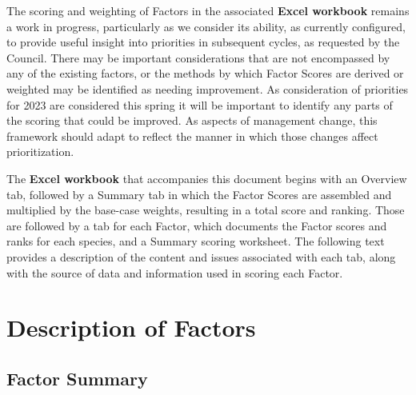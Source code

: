 \documentclass[11pt,
  english,
  a4paper,
]{article}
\begin{document}
\leavevmode\tagmcend\tagstructend\par


The scoring and weighting of Factors in the associated \textbf{Excel workbook} remains a work in progress, particularly as we consider its ability, as currently configured, to provide useful insight into priorities in subsequent cycles, as requested by the Council. There may be important considerations that are not encompassed by any of the existing factors, or the methods by which Factor Scores are derived or weighted may be identified as needing improvement. As consideration of priorities for 2023 are considered this spring it will be important to identify any parts of the scoring that could be improved. As aspects of management change, this framework should adapt to reflect the manner in which those changes affect prioritization.

\leavevmode\tagmcend\tagstructend\par


The \textbf{Excel workbook} that accompanies this document begins with an Overview tab, followed by a Summary tab in which the Factor Scores are assembled and multiplied by the base-case weights, resulting in a total score and ranking. Those are followed by a tab for each Factor, which documents the Factor scores and ranks for each species, and a Summary scoring worksheet. The following text provides a description of the content and issues associated with each tab, along with the source of data and information used in scoring each Factor.

\leavevmode\tagmcend\tagstructend\par


\hypertarget{description-of-factors}{%
\section{Description of Factors}\label{description-of-factors}}

\leavevmode\tagmcend\tagstructend


\hypertarget{factor-summary}{%
\subsection{Factor Summary}\label{factor-summary}}
\end{document}
